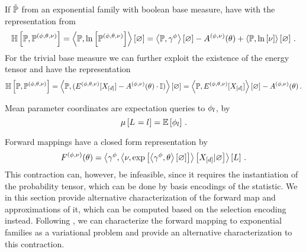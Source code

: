 \begin{example}\label{exa:cEntropyExp}
	If $\tilde{\mathbb{P}}$ from an exponential family with boolean base measure, have with the representation from 
	\begin{align*}
		\mathbb{H}\left[\mathbb{P},\mathbb{P}^{(\phi,\theta,\nu)}\right] 
		= \left\langle \mathbb{P},\ln \left[ \mathbb{P}^{(\phi,\theta,\nu)} \right]\right\rangle \left[ \varnothing \right] 
		= \left\langle \mathbb{P},\gamma^{\phi}\right\rangle \left[ \varnothing \right] - A^{(\phi,\nu)}(\theta) + \left\langle \mathbb{P},\ln \left[ \nu \right]\right\rangle \left[ \varnothing \right] \, . 
	\end{align*}
	For the trivial base measure we can further exploit the existence of the energy tensor and have the representation
		\[ \mathbb{H}\left[\mathbb{P},\mathbb{P}^{(\phi,\theta,\nu)}\right] = \left\langle \mathbb{P},(E^{(\phi,\theta,\nu)}[X_{[d]}]-A^{(\phi,\nu)}(\theta)\cdot \mathbb{I})\right\rangle \left[ \varnothing \right]
		=   \left\langle \mathbb{P},E^{(\phi,\theta,\nu)}[X_{[d]}]\right\rangle \left[ \varnothing \right] -A^{(\phi,\nu)}(\theta) \, .   \]
\end{example}








Mean parameter coordinates are expectation queries to $\phi_{l}$, by 
	\[ \mu\left[L_{}=l_{}\right] = \mathbb{E}\left[\phi_{l}\right] \, . \]
	
Forward mappings have a closed form representation by
	\[ F^{(\phi,\nu)}(\theta)
	= \left\langle \gamma^{\phi},\left\langle \nu,\mathrm{exp}\left[\left\langle \gamma^{\phi},\theta\right\rangle \left[ \varnothing \right]\right]\right\rangle \left[ X_{[d]} | \varnothing \right]\right\rangle \left[ L \right] \, . \]
This contraction can, however, be infeasible, since it requires the instantiation of the probability tensor, which can be done by basis encodings of the statistic.
We in this section provide alternative characterization of the forward map and approximations of it, which can be computed based on the selection encoding instead.
Following \cite{wainwright_graphical_2008}, we can characterize the forward mapping to exponential families as a variational problem and provide an alternative characterization to this contraction.



